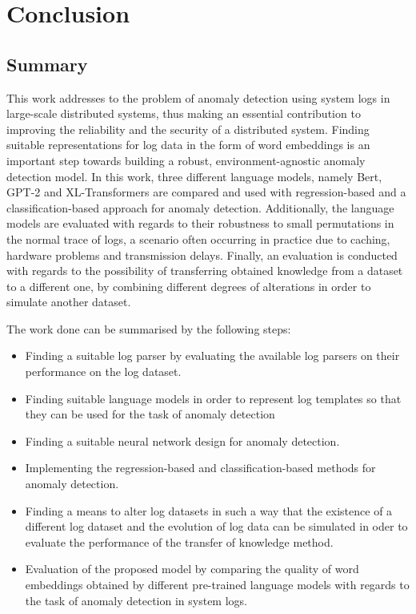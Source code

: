 \chapter{Conclusion\label{cha:conclusion}}



\section{Summary\label{sec:summary}}
This work addresses to the problem of anomaly detection using system logs in large-scale distributed systems, thus making an essential contribution to improving the reliability and the security of a distributed system. Finding suitable representations for log data in the form of word embeddings is an important step towards building a robust, environment-agnostic anomaly detection model. In this work, three different language models, namely Bert, GPT-2 and XL-Transformers are compared and used with regression-based and a classification-based approach for anomaly detection. Additionally, the language models are evaluated with regards to their robustness to small permutations in the normal trace of logs, a scenario often occurring in practice due to caching, hardware problems and transmission delays. Finally, an evaluation is conducted with regards to the possibility of transferring obtained knowledge from a dataset to a different one, by combining different degrees of alterations in order to simulate another dataset.

The work done can be summarised by the following steps:
\begin{itemize}
		\item Finding a suitable log parser by evaluating the available log parsers on their performance on the log dataset.
		\item Finding suitable language models in order to represent log templates so that they can be used for the task of anomaly detection
		\item Finding a suitable neural network design for anomaly detection.
		\item Implementing the regression-based and classification-based methods for anomaly detection.
		\item Finding a means to alter log datasets in such a way that the existence of a different log dataset and the evolution of log data can be simulated in oder to evaluate the performance of the transfer of knowledge method.
		\item Evaluation of the proposed model by comparing the quality of word embeddings obtained by different pre-trained language models with regards to the task of anomaly detection in system logs.
\end{itemize}


